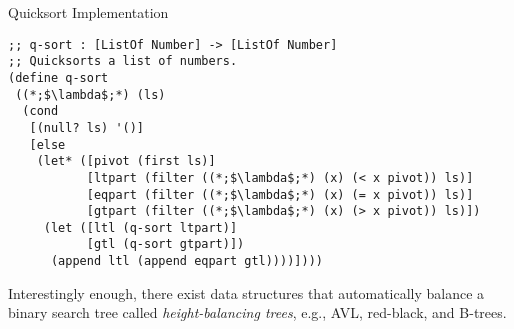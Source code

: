 \begin{cl}[]{Quicksort Implementation}\begin{lstlisting}[language=MyScheme]
;; q-sort : [ListOf Number] -> [ListOf Number]
;; Quicksorts a list of numbers.
(define q-sort
 ((*;$\lambda$;*) (ls)
  (cond
   [(null? ls) '()]
   [else
    (let* ([pivot (first ls)]
           [ltpart (filter ((*;$\lambda$;*) (x) (< x pivot)) ls)]
           [eqpart (filter ((*;$\lambda$;*) (x) (= x pivot)) ls)]
           [gtpart (filter ((*;$\lambda$;*) (x) (> x pivot)) ls)])
     (let ([ltl (q-sort ltpart)]
           [gtl (q-sort gtpart)])
      (append ltl (append eqpart gtl))))])))
\end{lstlisting}\end{cl}

Interestingly enough, there exist data structures that automatically balance a binary search tree called \textit{height-balancing trees}, e.g., AVL, red-black, and B-trees.



